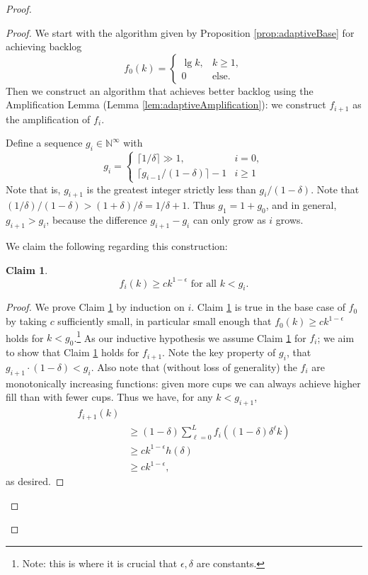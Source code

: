\documentclass[twocolumn]{article}[10pt]
\newtheorem{clm}{Claim}
\begin{document}
\begin{proof}
\begin{proof}
  We start with the algorithm given by Proposition \ref{prop:adaptiveBase} for achieving backlog
  $$f_0(k) = 
  \begin{cases} 
    \lg k, & k\geq 1, \\
    0 & \text{else.}
  \end{cases}$$
  Then we construct an algorithm that achieves better backlog using the
  Amplification Lemma (Lemma \ref{lem:adaptiveAmplification}):
  we construct $f_{i+1}$ as the amplification of $f_{i}$. 

  Define a sequence $g_i \in \mathbb{N}^\infty$ with 
  $$ g_i = \begin{cases}
    \lceil 1/\delta \rceil \gg 1,  & i = 0,\\
    \lceil g_{i-1}/(1-\delta)\rceil -1 & i  \ge 1
  \end{cases} $$
  Note that is, $g_{i+1}$ is the greatest integer strictly less than $g_i/(1-\delta)$.
  Note that $ (1/\delta) / (1-\delta) > (1+\delta)/\delta = 1/\delta + 1.$
  Thus $g_1 = 1+ g_0$, and in general, $g_{i+1} > g_i$, because the difference
  $g_{i+1}-g_i$ can only grow as $i$ grows.

  We claim the following regarding this construction:
  \begin{clm}
    \label{clm:fikinduction}
  \begin{equation}
    f_i(k) \ge ck^{1-\epsilon} \text{ for all } k < g_i. 
  \end{equation}
  \end{clm}
  \begin{proof}
  We prove Claim \ref{clm:fikinduction} by induction on $i$.
  Claim \ref{clm:fikinduction} is true in the base case of $f_0$ by taking $c$
  sufficiently small, in particular small enough that $f_0(k) \ge
  ck^{1-\epsilon}$ holds for $k < g_0$.\footnote{Note: this is where it is
    crucial that $\epsilon, \delta$ are constants.}
  As our inductive hypothesis we assume Claim \ref{clm:fikinduction} for $f_i$;
  we aim to show that Claim \ref{clm:fikinduction} holds for $f_{i+1}$. Note
  the key property of $g_i$, that $g_{i+1}\cdot(1-\delta) < g_i$. Also note
  that (without loss of generality) the $f_i$ are monotonically increasing
  functions: given more cups we can always achieve higher fill than with fewer
  cups. Thus we have, for any $k<g_{i+1}$,
  \begin{align*}
    f_{i+1}(k) &\\
    &\ge (1-\delta)\sum_{\ell=0}^L f_i((1-\delta)\delta^\ell k)\\
    &\ge ck^{1-\epsilon}h(\delta)\\
    &\ge ck^{1-\epsilon},
  \end{align*}
  as desired. 
  \end{proof}


\end{proof}
\end{proof}
\end{document}
